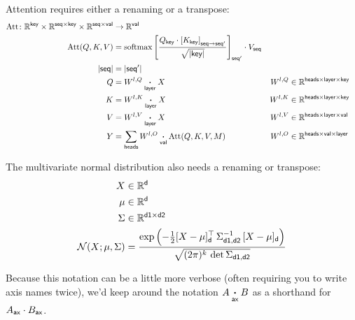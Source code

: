 Attention requires either a renaming or a transpose:
\begin{align*}
  \text{Att} \colon \mathbb{R}^{\name{key}} \times \mathbb{R}^{\name{seq} \times\name{key}} \times \mathbb{R}^{\name{seq} \times\name{val}} &\rightarrow \mathbb{R}^{\name{val}} \\
  \text{Att}(Q,K,V) &= \softmax \left[ \frac{Q_{\name{key}} \cdot \nmov{seq}{seq'}{K_{\name{key}}}}{\sqrt{|\name{key}|}} \right]_{\name{seq'}} \cdot V_{\name{seq}} \\
  |\name{seq}| &= |\name{seq'}| \\
  Q &= W^{l,Q} \ndot{layer} X & W^{l,Q} &\in \mathbb{R}^{\name{heads} \times \name{layer} \times \name{key}} \\
  K &= W^{l,K} \ndot{layer} X & W^{l,K} &\in \mathbb{R}^{\name{heads} \times \name{layer} \times \name{key}} \\
  V &= W^{l,V} \ndot{layer} X & W^{l,V} &\in \mathbb{R}^{\name{heads} \times \name{layer} \times \name{val}} \\
  Y &= \nsum{heads} W^{l,O} \ndot{val} \text{Att}(Q, K, V, M) & W^{l,O} &\in \mathbb{R}^{\name{heads} \times \name{val} \times \name{layer}}
\end{align*}

The multivariate normal distribution also needs a renaming or transpose:
\begin{align*} 
X &\in \mathbb{R}^{\name{d}}  \\
\mu &\in \mathbb{R}^{\name{d}}  \\
\Sigma & \in \mathbb{R}^{\name{d1} \times \name{d2}}  \\
{\cal N}(X; \mu, \Sigma) &= \frac{\displaystyle \exp\left(-\tfrac{1}{2} [X - \mu]_{\name{d}}^\top \, \Sigma_{\name{d1},\name{d2}}^{-1} \, [X - \mu]_{\name{d}} \right)}{\sqrt{(2 \pi)^k \, \mathop{\text{det}} \Sigma_{\name{d1},\name{d2}}}}
\end{align*}

Because this notation can be a little more verbose (often requiring you to write axis names twice), we'd keep around the notation $A \ndot{ax} B$ as a shorthand for $A_{\name{ax}} \cdot B_{\name{ax}}$.

